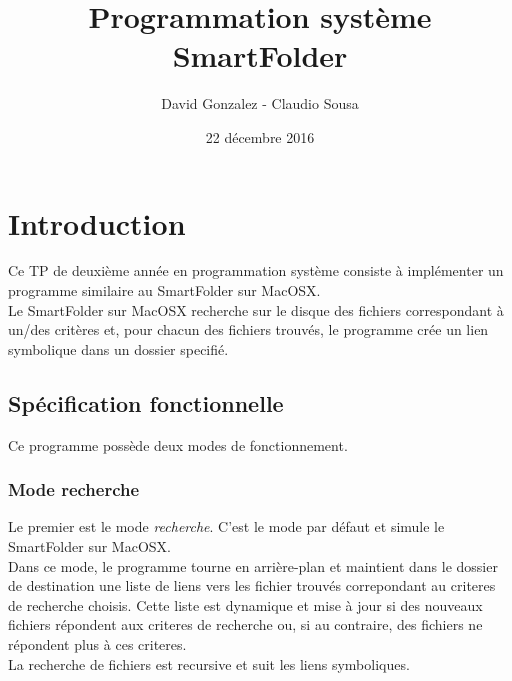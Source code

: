\documentclass[11pt, a4paper]{article}
\begin{document}
\title
{
    \Huge{Programmation système} \\
    \Huge{SmartFolder}
}
\author
{
    \LARGE{David Gonzalez - Claudio Sousa}
}
\date{22 décembre 2016}
\maketitle

\begin{center}
\end{center}

\thispagestyle{empty}

\newpage

\section{Introduction}

Ce TP de deuxième année en programmation système consiste à implémenter un programme similaire au SmartFolder sur MacOSX. \\

Le SmartFolder sur MacOSX recherche sur le disque des fichiers correspondant à un/des critères et,
pour chacun des fichiers trouvés, le programme crée un lien symbolique dans un dossier specifié.

\subsection{Spécification fonctionnelle}
Ce programme possède deux modes de fonctionnement.

\subsubsection{Mode recherche}
Le premier est le mode \textit{recherche}.
C'est le mode par défaut et simule le SmartFolder sur MacOSX. \\

Dans ce mode, le programme tourne en arrière-plan et maintient dans le dossier de destination une liste de liens vers les fichier trouvés correpondant au criteres de recherche choisis.
Cette liste est dynamique et mise à jour si des nouveaux fichiers répondent aux criteres de recherche ou, si au contraire, des fichiers ne répondent plus à ces criteres. \\

La recherche de fichiers est recursive et suit les liens symboliques.
\end{document}
